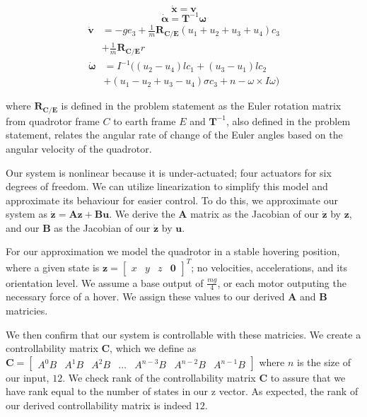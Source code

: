 \documentclass{article}
\begin{document}
\begin{multicols}{2}
\begin{equation}
    \mathbf{\dot{x}} =\mathbf{v}
\end{equation}
\begin{equation}
    \bm{\dot{\alpha}} =\mathbf{T}^{-1}\bm{\omega}
\end{equation}
\begin{align}
    \mathbf{\dot{v}} &=-ge_3+\frac{1}{m}\mathbf{R_{C/E}}(u_1+u_2+u_3+u_4)c_3 \nonumber\\ &+\frac{1}{m}\mathbf{R_{C/E}}r
\end{align}
\begin{align}
    \bm{\dot{\omega}} &=I^{-1}((u_2-u_4)lc_1+(u_3-u_1)lc_2 \nonumber\\ &+(u_1-u_2+u_3-u_4)\sigma c_3+n-\omega \times I \omega)
\end{align}

\noindent where $\mathbf{R_{C/E}}$ is defined in the problem statement as the Euler rotation matrix from quadrotor frame $C$ to earth frame $E$ and $\mathbf{T}^{-1}$, also defined in the problem statement, relates the angular rate of change of the Euler angles based on the angular velocity of the quadrotor.

Our system is nonlinear because it is under-actuated; four actuators for six degrees of freedom. We can utilize linearization to simplify this model and approximate its behaviour for easier control. To do this, we approximate our system as $\boldsymbol{\dot{z}}=\boldsymbol{A}\boldsymbol{z}+\boldsymbol{B}\boldsymbol{u}$. We derive the $\boldsymbol{A}$ matrix as the Jacobian of our $\boldsymbol{\dot{z}}$ by $\boldsymbol{z}$, and our $\boldsymbol{B}$ as the Jacobian of our $\boldsymbol{\dot{z}}$ by $\boldsymbol{u}$. 

For our approximation we model the quadrotor in a stable hovering position, where a given state is $\boldsymbol{z}=\begin{bmatrix} 
x & y & z & \boldsymbol{0}\end{bmatrix}^T$; no velocities, accelerations, and its orientation level. We assume a base output of $\frac{mg}{4}$, or each motor outputing the necessary force of a hover. We assign these values to our derived $\boldsymbol{A}$ and $\boldsymbol{B}$ matricies.

We then confirm that our system is controllable with these matricies. We create a controllability matrix $\boldsymbol{C}$, 
which we define as $\boldsymbol{C} = \begin{bmatrix} A^0B & A^1B & A^2B & \dots & A^{n-3}B & A^{n-2}B & A^{n-1}B\end{bmatrix}$ 
where $n$ is the size of our input, $12$. We check rank of the controllability matrix $\boldsymbol{C}$ to assure that we have rank equal to the number of states in our z vector. As expected, the rank of our derived controllability matrix is indeed $12$.


\end{multicols}
\end{document}
